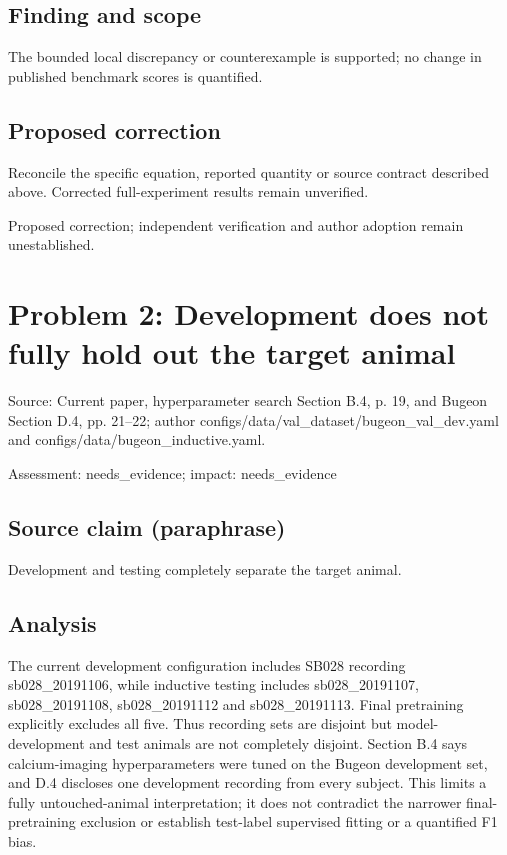 \documentclass[11pt]{article}
\begin{document}
\subsection*{Finding and scope}

The bounded local discrepancy or counterexample is supported; no change in published benchmark scores is quantified.

\subsection*{Proposed correction}

Reconcile the specific equation, reported quantity or source contract described above. Corrected full-experiment results remain unverified.

Proposed correction; independent verification and author adoption remain unestablished.

\section*{Problem 2: Development does not fully hold out the target animal}

Source: Current paper, hyperparameter search Section B.4, p. 19, and Bugeon Section D.4, pp. 21–22; author configs/data/val\_dataset/bugeon\_val\_dev.yaml and configs/data/bugeon\_inductive.yaml.

Assessment: needs\_evidence; impact: needs\_evidence

\subsection*{Source claim (paraphrase)}

Development and testing completely separate the target animal.

\subsection*{Analysis}

The current development configuration includes SB028 recording sb028\_20191106, while inductive testing includes sb028\_20191107, sb028\_20191108, sb028\_20191112 and sb028\_20191113. Final pretraining explicitly excludes all five. Thus recording sets are disjoint but model-development and test animals are not completely disjoint. Section B.4 says calcium-imaging hyperparameters were tuned on the Bugeon development set, and D.4 discloses one development recording from every subject. This limits a fully untouched-animal interpretation; it does not contradict the narrower final-pretraining exclusion or establish test-label supervised fitting or a quantified F1 bias.
\end{document}
